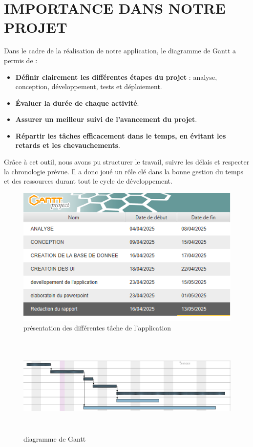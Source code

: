 \documentclass[english,12pt,a4paper]{report}
\begin{document}
\section{IMPORTANCE DANS NOTRE PROJET}
Dans le cadre de la réalisation de notre application, le diagramme de Gantt a permis de :
\begin{itemize}
	\item \textbf{Définir clairement les différentes étapes du projet} : analyse, conception, développement, tests et déploiement.
	\item \textbf{Évaluer la durée de chaque activité}.
	\item \textbf{Assurer un meilleur suivi de l’avancement du projet}.
	\item \textbf{Répartir les tâches efficacement dans le temps, en évitant les retards et les chevauchements}.
\end{itemize}
Grâce à cet outil, nous avons pu structurer le travail, suivre les délais et respecter la chronologie prévue. Il a donc joué un rôle clé dans la bonne gestion du temps et des ressources durant tout le cycle de développement.
\clearpage

\begin{figure}[h]
	\centering
	\begin{center}
		\includegraphics*[height=0.3 \textheight]{gantTache.png}
	\end{center}
	\caption{présentation des différentes tâche de l'application}
	\label{fig17: gantPresentation des tache}
\end{figure}

\begin{figure}[h]
	\centering
	\begin{center}
		\includegraphics[height=5cm, width=15cm]{gantDiagram.png}
	\end{center}
	\caption{diagramme de Gantt}
	\label{fig18: gantPresentation}
\end{figure}
\end{document}
